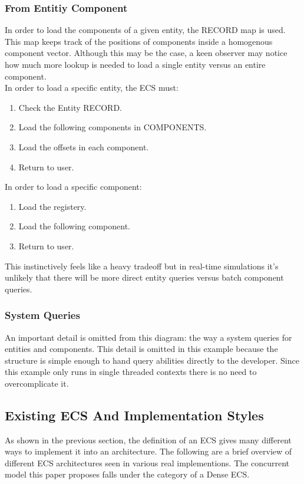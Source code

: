\subsubsection{From Entitiy \textrightarrow{} Component}
In order to load the components of a given entity, the RECORD map is used. This map keeps track of the positions of components inside a homogenous component vector. Although this may be the case, a keen observer may notice how much more lookup is needed to load a single entity versus an entire component. \\

In order to load a specific entity, the ECS must:

\begin{enumerate}
    \item Check the Entity RECORD.
    \item Load the following components in COMPONENTS.
    \item Load the offsets in each component.
    \item Return to user.
\end{enumerate}

In order to load a specific component:

\begin{enumerate}
    \item Load the registery.
    \item Load the following component.
    \item Return to user.
\end{enumerate}

This instinctively feels like a heavy tradeoff but in real-time simulations it's unlikely that there will be more direct entity queries versus batch component queries.


\subsubsection{System Queries}
An important detail is omitted from this diagram: the way a system queries for entities and components. This detail is omitted in this example because the structure is simple enough to hand query abilities directly to the developer. Since this example only runs in single threaded contexts there is no need to overcomplicate it.

\subsection{Existing ECS And Implementation Styles}
As shown in the previous section, the definition of an ECS gives many different ways to implement it into an architecture. The following are a brief overview of different ECS architectures seen in various real implementions. The concurrent model this paper proposes falls under the category of a Dense ECS.  

